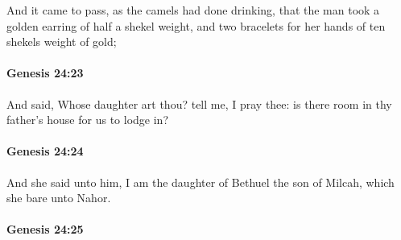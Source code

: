 			And it came to pass, as the camels had done drinking, that the man took a golden earring of half a shekel weight, and two bracelets for her hands of ten shekels weight of gold;


		\paragraph{Genesis 24:23} %
			\label{GENESIS-24-23}

			And said, Whose daughter art thou?  tell me, I pray thee: is there room in thy father's house for us to lodge in?


		\paragraph{Genesis 24:24} %
			\label{GENESIS-24-24}

			And she said unto him, I am the daughter of Bethuel the son of Milcah, which she bare unto Nahor.


		\paragraph{Genesis 24:25} %
			\label{GENESIS-24-25}

